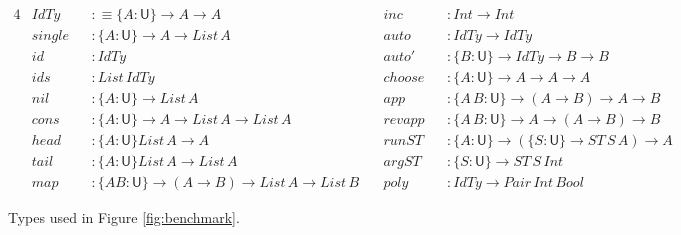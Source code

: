 \documentclass[acmsmall,review,anonymous,prologue,dvipsnames]{acmart}\settopmatter{printfolios=true,printccs=false,printacmref=false}
\renewcommand{\U}{\mathsf{U}}
\theoremstyle{remark}
\begin{document}
{\small

\begin{figure}
\begin{alignat*}{4}
  & IdTy   && :\equiv \{A : \U\}\to A \to A   \hspace{10em}         && inc    && : Int \to Int                                        \\
  & single && : \{A : \U\} \to A \to List\,A                       && auto   && : IdTy \to IdTy                                      \\
  & id     && : IdTy                                               && auto'  && : \{B : \U\}\to IdTy \to B \to B                     \\
  & ids    && : List\,IdTy                                         && choose && : \{A : \U\} \to A \to A \to A                       \\
  & nil    && : \{A : \U\}\to List\,A                              && app    && : \{A\,B : \U\} \to (A \to B) \to A \to B            \\
  & cons   && : \{A : \U\} \to A \to List\,A \to List\,A           && revapp && : \{A\,B : \U\} \to A \to (A \to B) \to B            \\
  & head   && : \{A : \U\} List\,A \to A                           && runST  && : \{A : \U\} \to (\{S : \U\} \to ST\,S\,A) \to A     \\
  & tail   && : \{A : \U\} List\,A \to List\,A                     && argST  && : \{S : \U\}\to ST\,S\,Int                           \\
  & map    && : \{A B : \U\} \to (A \to B) \to List\,A \to List\,B && poly   && : IdTy \to Pair\,Int\,Bool
\end{alignat*}
\caption{Types used in Figure \ref{fig:benchmark}.}
\label{fig:benchmark_types}
\end{figure}

}
\end{document}
